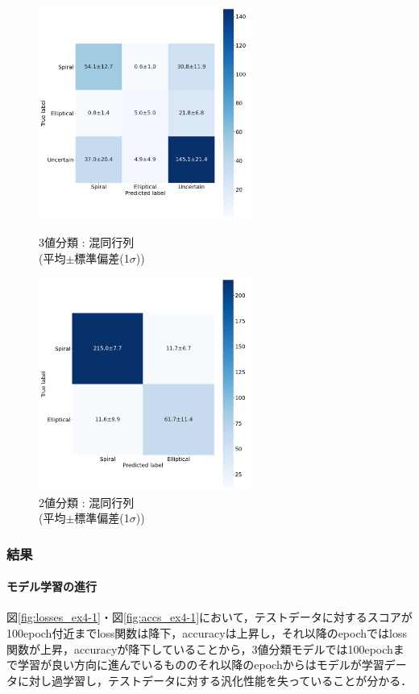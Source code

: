 \documentclass[a4j, 11pt]{jreport}
\begin{document}
\newpage

\begin{figure}[H]
  \begin{minipage}[b]{0.45\hsize}
    \centering
    \includegraphics[keepaspectratio, width=7cm]{images/cm_mean_std_ex4-1.png}
    \caption{3値分類 : 混同行列\\(平均$\pm$標準偏差(1$\sigma$))}
		\label{fig:cm_ex4-1}
  \end{minipage}
  \begin{minipage}[b]{0.45\hsize}
    \centering
    \includegraphics[keepaspectratio, width=7cm]{images/cm_mean_std_ex4-2.png}
    \caption{2値分類 : 混同行列\\(平均$\pm$標準偏差(1$\sigma$))}
		\label{fig:cm_ex4-2}
  \end{minipage}
\end{figure}

\subsubsection{結果}
\paragraph{モデル学習の進行}
図\ref{fig:losses_ex4-1}・図\ref{fig:accs_ex4-1}において，テストデータに対するスコアが100epoch付近までloss関数は降下，accuracyは上昇し，それ以降のepochではloss関数が上昇，accuracyが降下していることから，3値分類モデルでは100epochまで学習が良い方向に進んでいるもののそれ以降のepochからはモデルが学習データに対し過学習し，テストデータに対する汎化性能を失っていることが分かる．
\end{document}

